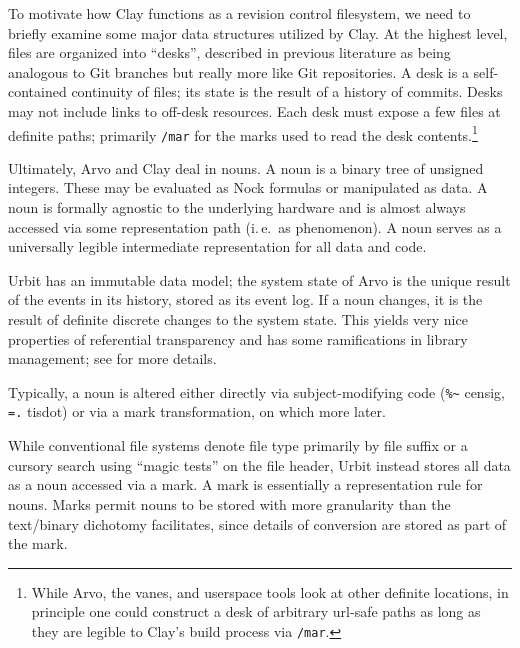 \documentclass[twoside]{article}
\begin{document}
To motivate how Clay functions as a revision control filesystem, we need to briefly examine some major data structures utilized by Clay.  At the highest level, files are organized into “desks”, described in previous literature as being analogous to Git branches but really more like Git repositories.  A desk is a self-contained continuity of files; its state is the result of a history of commits.  Desks may not include links to off-desk resources.  Each desk must expose a few files at definite paths; primarily \lstinline[style=inlinecode]{/mar} for the marks used to read the desk contents.\footnote{While Arvo, the vanes, and userspace tools look at other definite locations, in principle one could construct a desk of arbitrary {\sc url}-safe paths as long as they are legible to Clay's build process via \lstinline[style=inlinecode]{/mar}.}

Ultimately, Arvo and Clay deal in nouns.  A noun is a binary tree of unsigned integers.  These may be evaluated as Nock formulas or manipulated as data.  A noun is formally agnostic to the underlying hardware and is almost always accessed via some representation path (i.\,e.\ as phenomenon).  A noun serves as a universally legible intermediate representation for all data and code.

Urbit has an immutable data model; the system state of Arvo is the unique result of the events in its history, stored as its event log.  If a noun changes, it is the result of definite discrete changes to the system state.  This yields very nice properties of referential transparency and has some ramifications in library management; see \citet{Blackman2024a} for more details.

Typically, a noun is altered either directly via subject-modi\-fying code (\lstinline[style=inlinecode]{%~} censig, \lstinline[style=inlinecode]{=.} tisdot) or via a mark transformation, on which more later.

While conventional file systems denote file type primarily by file suffix or a cursory search using “magic tests” on the file header, Urbit instead stores all data as a noun accessed via a mark.  A mark is essentially a representation rule for nouns.  Marks permit nouns to be stored with more granularity than the text/binary dichotomy facilitates, since details of conversion are stored as part of the mark.
\end{document}
